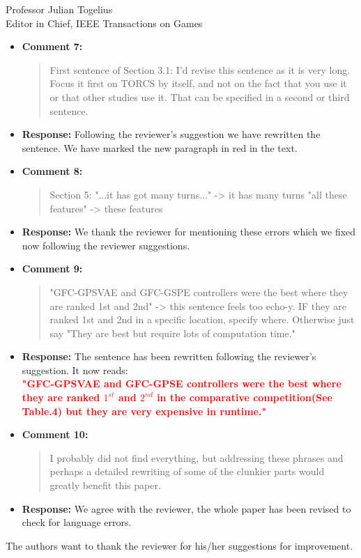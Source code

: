 \documentclass[10pt]{letter} %
\begin{document}
\begin{letter}{Professor Julian Togelius \\ Editor in Chief, IEEE Transactions on Games}
\begin{enumerate}
\begin{itemize}
		\item {\bf Comment 7:}
			\begin{quote}
				First sentence of Section 3.1: I'd revise this sentence as it is very long. Focus it first on TORCS by itself, and not on the fact that you use it or that other studies use it. That can be specified in a second or third sentence.
			\end{quote}	
		\item {\bf Response:} 
				Following the reviewer's suggestion we have rewritten the sentence. We have marked the new paragraph in red in the text.
		\item {\bf Comment 8:}
			\begin{quote}
				Section 5:
				"...it has got many turns..." -> it has many turns
				"all these features" -> these features
			\end{quote}	
		\item {\bf Response:} 
			We thank the reviewer for mentioning these errors which we fixed now following the reviewer suggestions.
		\item {\bf Comment 9:}
			\begin{quote}
				"GFC-GPSVAE and GFC-GSPE controllers were the best where they are ranked 1st and 2nd" -> this sentence feels too echo-y. IF they are ranked 1st and 2nd in a specific location, specify where. Otherwise just say "They are best but require lots of computation time."
			\end{quote}	
		\item {\bf Response:} 
			The sentence has been rewritten following the reviewer's suggestion. It now reads:\\
		\textcolor{red}{	{\bf "GFC-GPSVAE and GFC-GPSE controllers were the best where 	they are ranked $1^{st}$ and $2^{nd}$ in the comparative competition(See Table.4) but they are very expensive in runtime."}}	
		\item {\bf Comment 10:}
			\begin{quote}
				I probably did not find everything, but addressing these phrases and perhaps a detailed rewriting of some of the clunkier parts would greatly benefit this paper.
			\end{quote}	
		\item {\bf Response:} 
		We agree with the reviewer, the whole paper has been revised to check for language errors.	
    \end{itemize}

The authors want to thank the reviewer for his/her suggestions for improvement.


\end{enumerate}
\end{letter}
\end{document}
